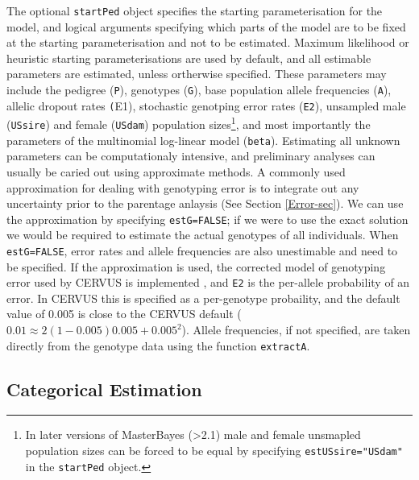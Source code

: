 \documentclass{article}
\begin{document}
The optional \texttt{startPed} object specifies the starting parameterisation for the model, and logical arguments specifying which parts of the model are to be fixed at the starting parameterisation and not to be estimated. Maximum likelihood or heuristic starting parameterisations are used by default, and all estimable parameters are estimated, unless ortherwise specified. These parameters may include the pedigree (\texttt{P}), genotypes (\texttt{G}), base population allele frequencies (\texttt{A}), allelic dropout rates \texttt(E1), stochastic genotping error rates (\texttt {E2}), unsampled male (\texttt{USsire}) and female (\texttt{USdam}) population sizes\footnote{In later versions of MasterBayes (>2.1) male and female unsmapled population sizes can be forced to be equal by specifying \texttt{estUSsire="USdam"} in the \texttt{startPed} object.}, and most importantly the parameters of the multinomial log-linear model (\texttt{beta}). Estimating all unknown parameters can be computationaly intensive, and preliminary analyses can usually be caried out using approximate methods.  A commonly used approximation for dealing with genotyping error is to integrate out any uncertainty prior to the parentage anlaysis (See Section \ref{Error-sec}).  We can use the approximation by specifying \texttt{estG=FALSE}; if we were to use the exact solution we would be required to estimate the actual genotypes of all individuals.  When \texttt{estG=FALSE}, error rates and allele frequencies are also unestimable and need to be specified.  If the approximation is used, the corrected model of genotyping error used by CERVUS is implemented \citep{Kalinowski.2006}, and \texttt{E2} is the per-allele probability of an error.  In CERVUS this is specified as a per-genotype probaility, and the default value of 0.005 is close to the CERVUS default ($0.01 \approx 2(1-0.005)0.005+0.005^{2}$).  Allele frequencies, if not specified, are taken directly from the genotype data using the function \texttt{extractA}.  


\subsection{Categorical Estimation}
\label{cat-sec}
\end{document}
